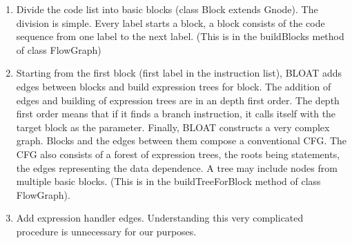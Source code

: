 \begin{enumerate}
\item Divide the code list into basic blocks (class Block extends Gnode).
The division is simple. Every label starts a block, a block consists of 
the code sequence from one label to the next label. (This is in the buildBlocks
method of class FlowGraph)
\item Starting from the first block (first label in the instruction list),
BLOAT adds edges between blocks and build expression trees for block.
The addition of edges and building of expression trees are in an depth
first order. The depth first order means that if it finds a branch
instruction, it calls itself with the target block as the parameter.
Finally, BLOAT constructs a very complex graph. Blocks and the edges
between them compose a conventional CFG. The CFG also consists
of a forest of expression trees, the roots being statements, the edges
representing the data dependence. A tree may include nodes from multiple
basic blocks.  (This is in the buildTreeForBlock method of class FlowGraph).
\item Add expression handler edges.  Understanding this very complicated procedure
is unnecessary for our purposes. 
\end{enumerate}
\vspace{0.3cm}
{\par\centering {} \par}
